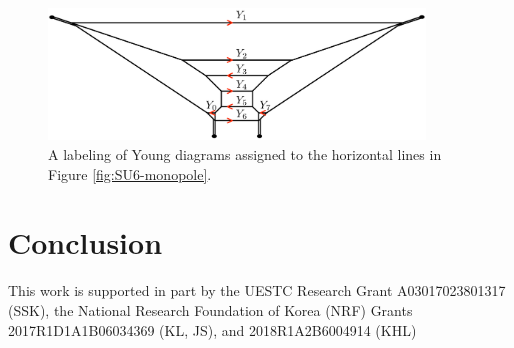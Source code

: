 \documentclass[letterpaper, 11pt]{article}
\begin{document}
{%
\begin{figure}[t]
\centering
\includegraphics[width=10cm]{SU6young.pdf}
\caption{A labeling of Young diagrams assigned to the horizontal lines in Figure \ref{fig:SU6-monopole}.}
\label{fig:SU6young}
\end{figure}



\section{Conclusion} \label{sec:conclusion}



\acknowledgments
This work is supported in part by the UESTC Research Grant A03017023801317 (SSK), the National Research Foundation of Korea (NRF) Grants 2017R1D1A1B06034369 (KL, JS), and 2018R1A2B6004914 (KHL)


\appendix
}
\end{document}
